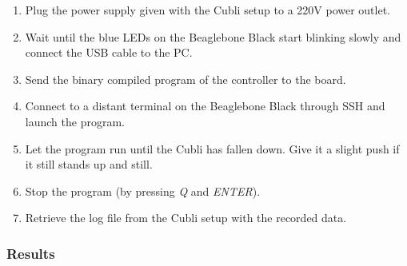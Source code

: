 \begin{enumerate}
  \item Plug the power supply given with the Cubli setup to a \si{220}{V} power outlet.
  \item Wait until the blue LEDs on the Beaglebone Black start blinking slowly and connect the USB cable to the PC.
  \item Send the binary compiled program of the controller to the board.
  \item Connect to a distant terminal on the Beaglebone Black through SSH and launch the program.
  \item Let the program run until the Cubli has fallen down. Give it a slight push if it still stands up and still.
  \item Stop the program (by pressing \textit{Q} and \textit{ENTER}).
  \item Retrieve the log file from the Cubli setup with the recorded data.
\end{enumerate}

\subsubsection{Results}

